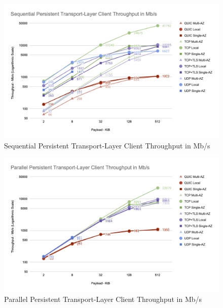 \begin{figure}[h!]
    \centering
    \includegraphics[width=\linewidth]{figures/charts/Sequential Persistent Transport-Layer Client Throughput in Mb_s.png}
    \caption{Sequential Persistent Transport-Layer Client Throughput in Mb/s}
    \label{fig:sequential_transport_throughput}
\end{figure}
\begin{figure}[h!]
    \centering
    \includegraphics[width=\linewidth]{figures/charts/Parallel Persistent Transport-Layer Client Throughput in Mb_s.png}
    \caption{Parallel Persistent Transport-Layer Client Throughput in Mb/s}
    \label{fig:parallel_transport_throughput}
\end{figure}
